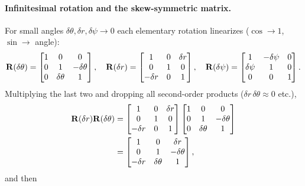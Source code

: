 \paragraph{Infinitesimal rotation and the skew-symmetric matrix.}
For small angles $\delta\theta,\delta r,\delta\psi\to 0$ each elementary rotation linearizes ($\cos\to1$, $\sin\to$ angle):
\begin{align}
\boldsymbol{\mathbf{R}}(\delta\theta) = \begin{bmatrix} 1 & 0 & 0 \\ 0 & 1 & -\delta\theta \\ 0 & \delta\theta & 1 \end{bmatrix},\quad
\boldsymbol{\mathbf{R}}(\delta r) = \begin{bmatrix} 1 & 0 & \delta r \\ 0 & 1 & 0 \\ -\delta r & 0 & 1 \end{bmatrix},\quad
\boldsymbol{\mathbf{R}}(\delta\psi) = \begin{bmatrix} 1 & -\delta\psi & 0 \\ \delta\psi & 1 & 0 \\ 0 & 0 & 1 \end{bmatrix}.
\end{align}
Multiplying the last two and dropping all second-order products ($\delta r\,\delta\theta\approx0$ etc.),
\begin{align}
\boldsymbol{\mathbf{R}}(\delta r)\boldsymbol{\mathbf{R}}(\delta\theta)
&= \begin{bmatrix} 1 & 0 & \delta r \\ 0 & 1 & 0 \\ -\delta r & 0 & 1 \end{bmatrix}
\begin{bmatrix} 1 & 0 & 0 \\ 0 & 1 & -\delta\theta \\ 0 & \delta\theta & 1 \end{bmatrix} \\
&= \begin{bmatrix} 1 & 0 & \delta r \\ 0 & 1 & -\delta\theta \\ -\delta r & \delta\theta & 1 \end{bmatrix},
\end{align}
and then
